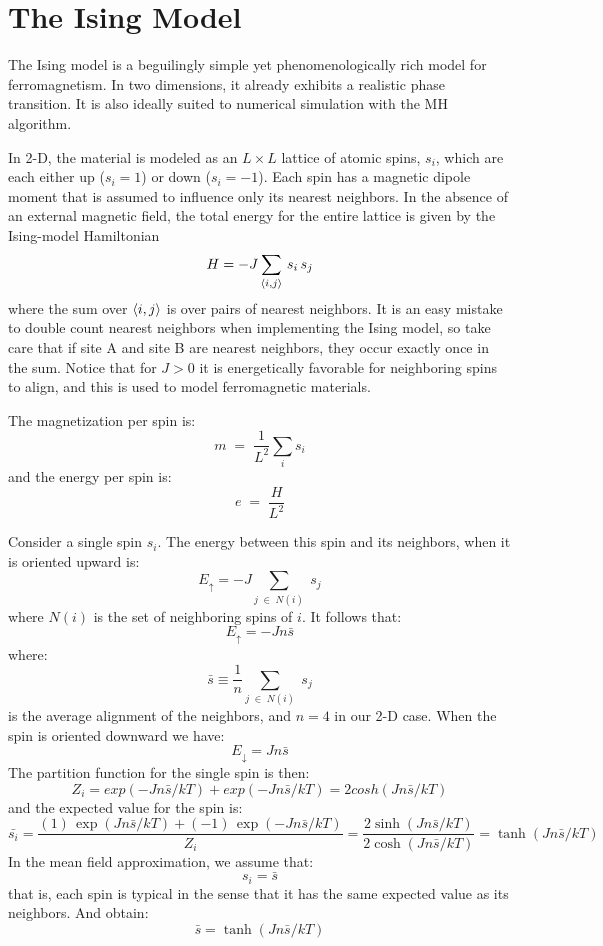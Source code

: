 \documentclass[12pt]{article}
\begin{document}
\section{The Ising Model}

The Ising model is a beguilingly simple yet phenomenologically rich
model for ferromagnetism.  In two dimensions, it already exhibits a
realistic phase transition.  It is also ideally suited to numerical
simulation with the MH algorithm.

In 2-D, the material is modeled as an $L \times L$ lattice of atomic
spins, $s_i$, which are each either up ($s_i=1$) or down ($s_i=-1$).
Each spin has a magnetic dipole moment that is assumed to influence
only its nearest neighbors.  In the absence of an external magnetic
field, the total energy for the entire lattice is given by the
Ising-model Hamiltonian
\begin{equation}
H = - J \sum_{\braket{i,j}} \, s_i \, s_j 
\end{equation}
where the sum over $\braket{i,j}$ is over pairs of nearest neighbors.
It is an easy mistake to double count nearest neighbors when
implementing the Ising model, so take care that if site A and site B
are nearest neighbors, they occur exactly once in the sum.  Notice
that for $J>0$ it is energetically favorable for neighboring spins to
align, and this is used to model ferromagnetic materials.

The magnetization per spin is:
\begin{equation}
  m \;=\; \frac{1}{L^2}\sum_i s_i
\end{equation}
and the energy per spin is:
\begin{equation}
  e \;=\; \frac{H}{L^2}
\end{equation}

Consider a single spin $s_i$.  The energy between this spin and its neighbors, when it is oriented upward is:
$$E_{\uparrow} = - J \sum_{j \; \in \; N(i)} \; s_j$$
where $N(i)$ is the set of neighboring spins of $i$. It follows that:
\begin{equation}
E_{\uparrow} = - J n \bar{s}
\end{equation}
where:
$$\bar{s} \equiv \frac{1}{n} \sum_{j \; \in \; N(i)} \; s_j $$
is the average alignment of the neighbors, and $n=4$ in our 2-D case.  When the spin is oriented downward we have:
\begin{equation}
E_{\downarrow} = J n \bar{s}
\end{equation}
The partition function for the single spin is then:
$$Z_i = exp(-Jn\bar{s}/kT) + exp(-Jn\bar{s}/kT) = 2 cosh(Jn\bar{s}/kT)$$
and the expected value for the spin is:
$$\bar{s_i} = \frac{(1)\,\exp(Jn\bar{s}/kT) + (-1)\,\exp(-Jn\bar{s}/kT)}{Z_i} = \frac{2 \sinh(Jn\bar{s}/kT)}{2 \cosh(Jn\bar{s}/kT)} = \tanh(Jn\bar{s}/kT)$$
In the mean field approximation, we assume that:
$$s_i = \bar{s}$$
that is, each spin is typical in the sense that it has the same
expected value as its neighbors.  And obtain:
\begin{equation}
\label{eqn:mfa}
\bar{s} = \tanh(Jn\bar{s}/kT)
\end{equation}
\end{document}
